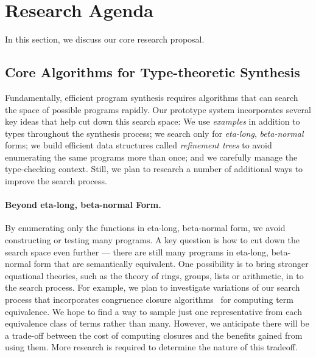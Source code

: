 

\section{Research Agenda}
\label{sec:research}

In this section, we discuss our core research proposal.

\subsection{Core Algorithms for Type-theoretic Synthesis}
\label{sec:core}

Fundamentally, efficient program synthesis requires algorithms
that can search the space of possible programs rapidly.
Our prototype system incorporates several key ideas that
help cut down this search space:  We use \emph{examples} in addition
to types throughout the synthesis process; 
we search only for \emph{eta-long}, \emph{beta-normal} forms; 
we build efficient data structures called
\emph{refinement trees} to avoid enumerating 
the same programs more than once; and we carefully manage the type-checking
context.  Still, we plan to research a number of additional ways to 
improve the search process.

\paragraph*{Beyond eta-long, beta-normal Form.}
By enumerating only the functions in eta-long, beta-normal form, we avoid 
constructing or testing many programs.  A key question is how
to cut down the search space even further --- there are still many programs
in eta-long, beta-normal form that are semantically equivalent.
One possibility is to bring stronger equational theories, such as the theory
of rings, groups, lists or arithmetic, in to the search process.  For example,
we plan to investigate variations of our search process that incorporates
congruence closure algorithms~\cite{shostak:congruence,nelson-oppen,sjoberg:congruence} for
computing term equivalence.  We hope to find a way to
sample just one representative from each equivalence class of terms
rather than many.  However, we anticipate there will be a trade-off
between the cost of computing closures and the benefits gained from using
them.  More research is required to determine the nature of this tradeoff.

